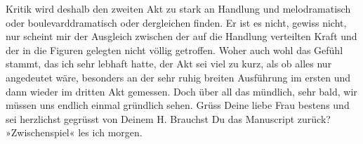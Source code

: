 \begin{ledgroupsized}[t]{13cm}
               Kritik wird deshalb den zweiten Akt zu stark an Handlung und melodramatisch oder
               boulevarddramatisch oder dergleichen finden. Er ist es nicht, gewiss nicht, nur
               scheint mir der Ausgleich zwischen der auf die Handlung verteilten Kraft und der in
               die Figuren gelegten nicht völlig getroffen. Woher auch wohl das Gefühl stammt, das
               ich sehr lebhaft hatte, der Akt sei viel zu kurz, als ob alles nur angedeutet wäre,
               besonders an der sehr ruhig breiten Ausführung im ersten und dann wieder im dritten
               Akt gemessen. Doch über all das mündlich, sehr bald, wir müssen uns endlich einmal
               gründlich sehen. Grüss Deine liebe Frau bestens und sei herzlichst gegrüsst von Deinem\pend
           \pstart \spacefill\mbox{H.}\pend{}\pstart
           \noindent{}Brauchst Du das Manuscript zurück? »Zwischenspiel« les ich morgen.\pend
                     \endnumbering{}\end{ledgroupsized}  \newcommand{\dateiname}{L01548}\newcommand{\titel}{Hermann Bahr an Arthur Schnitzler, 17. 9. 1905}\newcommand{\editorInnen}{ Kurt Ifkovits,  Martin Anton Müller}
            \footnotesize
\begin{ledgroupsized}[t]{11.5cm}
\end{ledgroupsized}
         
      